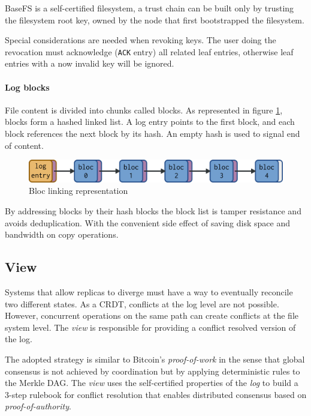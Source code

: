 \documentclass{sig-alternate}
\begin{document}
BaseFS is a self-certified filesystem, a trust chain can be built only by trusting the filesystem root key, owned by the node that first bootstrapped the filesystem.

Special considerations are needed when revoking keys. The user doing the revocation must acknowledge (\texttt{ACK} entry) all related leaf entries, otherwise leaf entries with a now invalid key will be ignored.


\paragraph{Log blocks}

File content is divided into chunks called blocks. As represented in figure \ref{fig:blocs}, blocks form a hashed linked list. A log entry points to the first block, and each block references the next block by its hash. An empty hash is used to signal end of content.

\begin{figure}
\centering
\includegraphics[width=\columnwidth]{imgs/blocs.png}
\caption{Bloc linking representation}
\label{fig:blocs}
\end{figure}

By addressing blocks by their hash blocks the block list is tamper resistance and avoids deduplication. With the convenient side effect of saving disk space and bandwidth on copy operations.

\subsection{View} \label{view}

Systems that allow replicas to diverge must have a way to eventually reconcile two different states. As a CRDT, conflicts at the log level are not possible. However, concurrent operations on the same path can create conflicts at the file system level. The \textit{view} is responsible for providing a conflict resolved version of the log.

The adopted strategy is similar to Bitcoin's \textit{proof-of-work} in the sense that global consensus is not achieved by coordination but by applying deterministic rules to the Merkle DAG. The \textit{view} uses the self-certified properties of the \textit{log} to build a 3-step rulebook for conflict resolution that enables distributed consensus based on \textit{proof-of-authority}.
\end{document}
